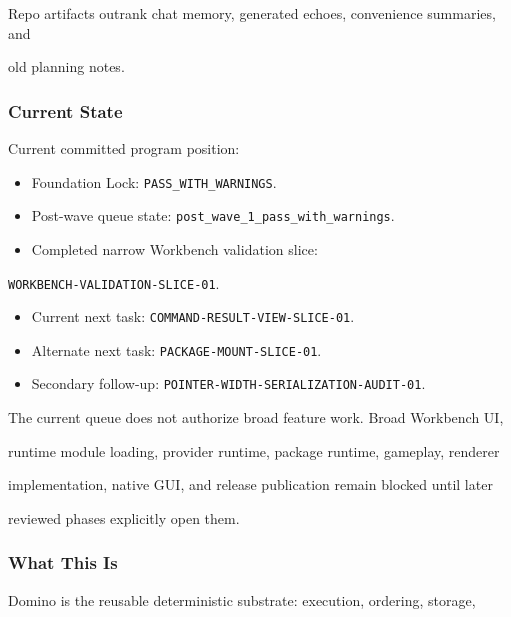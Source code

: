 \documentclass[9pt,a4paper,openany]{book}
\begin{document}
Repo artifacts outrank chat memory, generated echoes, convenience summaries, and

old planning notes.\allowbreak{}


\subsubsection{Current State}

Current committed program position:


\begin{itemize}
\item Foundation Lock: \texttt{PASS\_\allowbreak{}WITH\_\allowbreak{}WARNINGS}.\allowbreak{}
\item Post-\allowbreak{}wave queue state: \texttt{post\_\allowbreak{}wave\_\allowbreak{}1\_\allowbreak{}pass\_\allowbreak{}with\_\allowbreak{}warnings}.\allowbreak{}
\item Completed narrow Workbench validation slice:
\end{itemize}
\texttt{WORKBENCH-\allowbreak{}VALIDATION-\allowbreak{}SLICE-\allowbreak{}01}.\allowbreak{}

\begin{itemize}
\item Current next task: \texttt{COMMAND-\allowbreak{}RESULT-\allowbreak{}VIEW-\allowbreak{}SLICE-\allowbreak{}01}.\allowbreak{}
\item Alternate next task: \texttt{PACKAGE-\allowbreak{}MOUNT-\allowbreak{}SLICE-\allowbreak{}01}.\allowbreak{}
\item Secondary follow-\allowbreak{}up: \texttt{POINTER-\allowbreak{}WIDTH-\allowbreak{}SERIALIZATION-\allowbreak{}AUDIT-\allowbreak{}01}.\allowbreak{}
\end{itemize}

The current queue does not authorize broad feature work.\allowbreak{} Broad Workbench UI,

runtime module loading, provider runtime, package runtime, gameplay, renderer

implementation, native GUI, and release publication remain blocked until later

reviewed phases explicitly open them.\allowbreak{}


\subsubsection{What This Is}

Domino is the reusable deterministic substrate: execution, ordering, storage,
\end{document}
